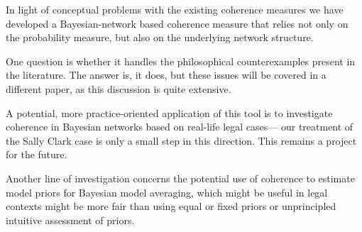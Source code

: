 \documentclass[10pt,]{scrartcl}
\begin{document}
\begin{table}[H]
    \caption{Coherence scores for the witness scenarios.}
    \label{tab:witnesses}
\end{table}














In light of conceptual problems with the existing coherence measures we have developed a Bayesian-network based coherence measure that relies not only on the probability measure, but also on the underlying network structure. 

One question is whether it handles the philosophical counterexamples present in the literature. The answer is, it does, but these issues will be covered in a different paper, as this discussion is quite extensive. 

A potential, more practice-oriented  application of this tool is to investigate coherence in  Bayesian networks based on real-life legal cases--- our treatment of the Sally Clark case is only a small step in this direction. This remains a project for the future.

Another line of investigation concerns
the potential use of coherence to    estimate model priors for Bayesian model averaging, which might be useful in legal contexts might be more fair  than using equal or fixed priors or unprincipled intuitive assessment of priors. 































\end{document}
